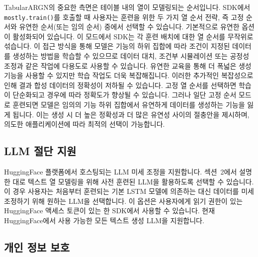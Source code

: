 TabularARGN의 중요한 측면은 테이블 내의 열이 모델링되는 순서입니다.
SDK에서 \texttt{mostly.train()}를 호출할 때 사용자는 훈련을 위한 두 가지 열 순서 전략, 즉 고정 순서와 유연한 순서(또는 임의 순서) 중에서 선택할 수 있습니다.
기본적으로 유연한 옵션이 활성화되어 있습니다. 이 모드에서 SDK는 각 훈련 배치에 대한 열 순서를 무작위로 섞습니다. 이 접근 방식을 통해 모델은 기능의 하위 집합에 따라 조건이 지정된 데이터를 생성하는 방법을 학습할 수 있으므로 데이터 대치, 조건부 시뮬레이션 또는 공정성 조정과 같은 작업에 다용도로 사용할 수 있습니다.
유연한 교육을 통해 더 폭넓은 생성 기능을 사용할 수 있지만 학습 작업도 더욱 복잡해집니다. 이러한 추가적인 복잡성으로 인해 결과 합성 데이터의 정확성이 저하될 수 있습니다. 고정 열 순서를 선택하면 학습이 단순화되고 경우에 따라 정확도가 향상될 수 있습니다. 그러나 일단 고정 순서 모드로 훈련되면 모델은 임의의 기능 하위 집합에서 유연하게 데이터를 생성하는 기능을 잃게 됩니다.
이는 생성 시 더 높은 정확성과 더 많은 유연성 사이의 절충안을 제시하며, 의도한 애플리케이션에 따라 최적의 선택이 가능합니다.



\subsection{LLM 절단 지원}

HuggingFace 플랫폼에서 호스팅되는 LLM 미세 조정을 지원합니다.
섹션~2에서 설명한 대로 텍스트 열 모델링을 위해 사전 훈련된 LLM을 활용하도록 선택할 수 있습니다. 이 경우 사용자는 처음부터 훈련되는 기본 LSTM 모델에 의존하는 대신 데이터를 미세 조정하기 위해 원하는 LLM을 선택합니다. 이 옵션은 사용자에게 읽기 권한이 있는 HuggingFace 액세스 토큰이 있는 한 SDK에서 사용할 수 있습니다.
현재 HuggingFace에서 사용 가능한 모든 텍스트 생성 LLM을 지원합니다.

\subsection{개인 정보 보호}


